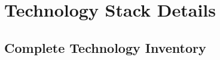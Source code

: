 \appendix

\chapter{Technology Stack Details}
\label{app:tech-stack}

\section{Complete Technology Inventory}

